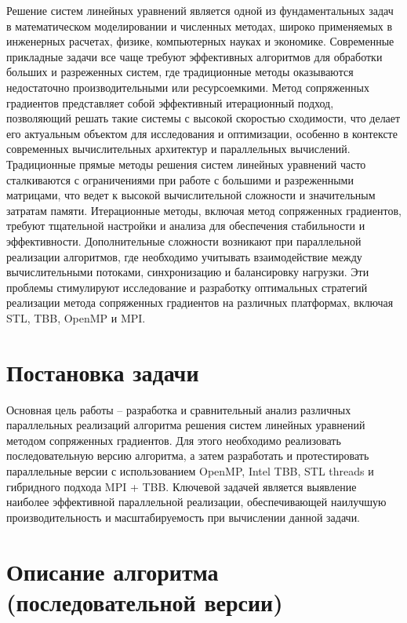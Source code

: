 \documentclass[12pt]{article}
\begin{document}
\hspace*{1.35em} Решение систем линейных уравнений является одной из фундаментальных задач в математическом моделировании и численных методах, широко применяемых в инженерных расчетах, физике, компьютерных науках и экономике. Современные прикладные задачи все чаще требуют эффективных алгоритмов для обработки больших и разреженных систем, где традиционные методы оказываются недостаточно производительными или ресурсоемкими. Метод сопряженных градиентов представляет собой эффективный итерационный подход, позволяющий решать такие системы с высокой скоростью сходимости, что делает его актуальным объектом для исследования и оптимизации, особенно в контексте современных вычислительных архитектур и параллельных вычислений.
Традиционные прямые методы решения систем линейных уравнений часто сталкиваются с ограничениями при работе с большими и разреженными матрицами, что ведет к высокой вычислительной сложности и значительным затратам памяти. Итерационные методы, включая метод сопряженных градиентов, требуют тщательной настройки и анализа для обеспечения стабильности и эффективности. Дополнительные сложности возникают при параллельной реализации алгоритмов, где необходимо учитывать взаимодействие между вычислительными потоками, синхронизацию и балансировку нагрузки. Эти проблемы стимулируют исследование и разработку оптимальных стратегий реализации метода сопряженных градиентов на различных платформах, включая STL, TBB, OpenMP и MPI.

\section{Постановка задачи}

\hspace*{1.35em}Основная цель работы – разработка и сравнительный анализ различных параллельных реализаций алгоритма решения систем линейных уравнений методом сопряженных градиентов. Для этого необходимо реализовать последовательную версию алгоритма, а затем разработать и протестировать параллельные версии с использованием OpenMP, Intel TBB, STL threads и гибридного подхода MPI + TBB. Ключевой задачей является выявление наиболее эффективной параллельной реализации, обеспечивающей наилучшую производительность и масштабируемость при вычислении данной задачи.

\section{Описание алгоритма (последовательной версии)}
\end{document}
